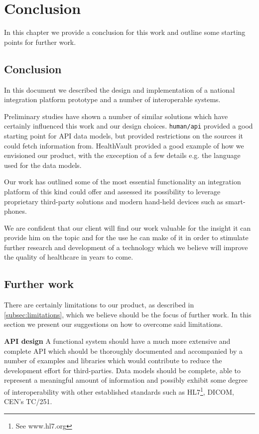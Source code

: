 \chapter{Conclusion}
\label{ch:conclusion}

In this chapter we provide a conclusion for this work and outline some
starting points for further work.

\section{Conclusion}

In this document we described the design and implementation of a national integration
platform prototype and a number of interoperable systems.

Preliminary studies have shown a number of similar solutions which have certainly influenced
this work and our design choices. \verb|human/api| provided a good starting point for API data models,
but provided restrictions on the sources it could fetch information from.
HealthVault provided a good example of how we envisioned our product, with the exeception
of a few details e.g. the language used for the data models.

Our work has outlined some of the most essential functionality an integration platform
of this kind could offer and assessed its possibility to leverage proprietary
third-party solutions and modern hand-held devices such as smart-phones.

We are confident that our client will find our work valuable for the insight it can provide
him on the topic and for the use he can make of it in order to stimulate further research
and development of a technology which we believe will improve the quality of healthcare in years to come.

\section{Further work}

There are certainly limitations to our product, as described in \ref{subsec:limitations}, which we believe should be
the focus of further work. In this section we present our suggestions on how to overcome said limitations.

\textbf{API design}\newline
A functional system should have a much more extensive and complete API which should be
thoroughly documented and accompanied by a number of examples and libraries which
would contribute to reduce the development effort for third-parties.
Data models should be complete, able to represent a meaningful amount of information
and possibly exhibit some degree of interoperability with other established standards
such as HL7\footnote{See www.hl7.org}, DICOM, CEN's TC/251.


